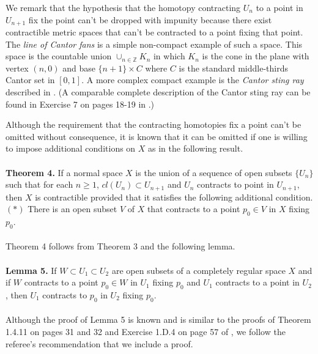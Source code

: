 \documentclass[12pt]{amsart}%
\theoremstyle{plain}
\numberwithin{equation}{section}
\begin{document}
\indent We remark that the hypothesis that the homotopy contracting $U_n$ to a point in $U_{n+1}$ fix the point can't be dropped with impunity because there exist contractible metric spaces that can't be contracted to a point fixing that point.  The \textit{line of Cantor fans} is a simple non-compact example of such a space.  This space is the countable union $\cup_{n \in \mathbb{Z}}K _n$   in which $K_n$ is the cone in the plane with vertex $(n,0)$ and base $\{n+1\} \times C$ where $C$ is the standard middle-thirds Cantor set in $[0,1]$.  A more complex compact example is the \textit{Cantor sting ray} described in \cite{2}.  (A comparable complete description of the Cantor sting ray can be found in Exercise 7 on pages 18-19 in \cite{4}.)

\indent Although the requirement that the contracting homotopies fix a point can't be omitted without consequence, it is known that it can be omitted if one is willing to impose additional conditions on $X$ as in the following result.
\\\\
\textbf{Theorem 4.} If a normal space $X$ is the union of a sequence of open subsets 
$\{U_n\}$ such that for each $n \geq 1$, $cl(U_n) \subset U_{n+1}$ and $U_n$ contracts to point in $U_{n+1}$, then $X$ is contractible provided that it satisfies the following additional condition.\\[6pt]
$( \ast )$ There is an open subset $V$ of $X$ that contracts to a point $p_0 \in V$ in $X$ fixing $p_0$.
\\\\
\indent Theorem 4 follows from Theorem 3 and the following lemma.
\\\\
\textbf{Lemma 5.} If $W \subset U_1 \subset U_2$ are open subsets of a completely regular space $X$ and if $W$ contracts to a point $p_0 \in W$ in $U_1$ fixing $p_0$ and $U_1$ contracts to a point in $U_2$, then $U_1$ contracts to $p_0$ in $U_2$ fixing $p_0$.
\\\\
\indent Although the proof of Lemma 5 is known and is similar to the proofs of Theorem 1.4.11 on pages 31 and 32 and Exercise 1.D.4 on page 57 of \cite{6}, we follow the referee's recommendation that we include a proof.  
\end{document}
